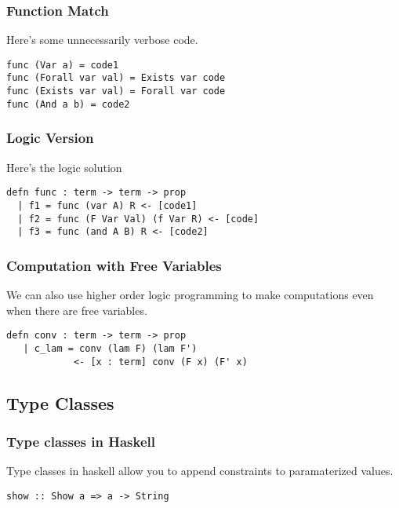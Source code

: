 \begin{frame}[fragile]
\frametitle{Function Match}

Here's some unnecessarily verbose code.

\begin{lstlisting}
func (Var a) = code1
func (Forall var val) = Exists var code
func (Exists var val) = Forall var code
func (And a b) = code2
\end{lstlisting}
\end{frame}


\begin{frame}[fragile]
\frametitle{Logic Version}

Here's the logic solution

\begin{lstlisting}
defn func : term -> term -> prop 
  | f1 = func (var A) R <- [code1]
  | f2 = func (F Var Val) (f Var R) <- [code]
  | f3 = func (and A B) R <- [code2]
\end{lstlisting}
\end{frame}


\begin{frame}[fragile]
\frametitle{Computation with Free Variables}

We can also use higher order logic programming to make computations even when 
there are free variables.

\begin{lstlisting}
defn conv : term -> term -> prop
   | c_lam = conv (lam F) (lam F') 
            <- [x : term] conv (F x) (F' x)
\end{lstlisting}
\end{frame}

\subsection{Type Classes}

\begin{frame}[fragile]
\frametitle{Type classes in Haskell}

Type classes in haskell allow you to append constraints
to paramaterized values.

\begin{lstlisting}
show :: Show a => a -> String
\end{lstlisting}
\end{frame}

